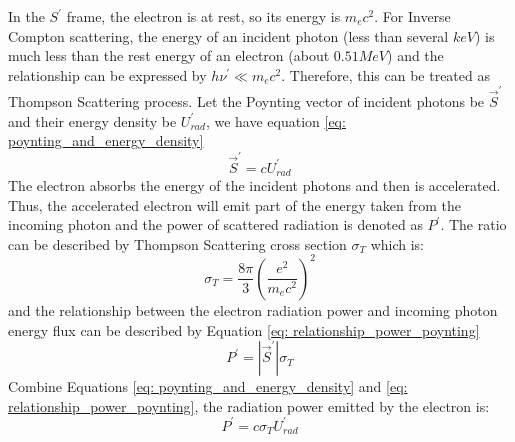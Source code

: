 \documentclass[12pt]{report}
\begin{document}
      In the $S^{\prime}$ frame, the electron is at rest, so its energy is $m_e c^2$. 
      For Inverse Compton scattering, the energy of an incident photon 
      (less than several $keV$) is much less than the rest energy of an electron 
      (about $0.51MeV$) and the relationship can be expressed by 
      $h\nu^{\prime} \ll m_e c^2$. Therefore, this can be treated as Thompson 
      Scattering process. Let the Poynting vector of incident photons be 
      $\vec{S}^{\prime}$ and their energy density be $U_{rad}^{\prime}$, we have 
      equation \ref{eq: poynting_and_energy_density}
      \begin{equation}
        \label{eq: poynting_and_energy_density}
        \vec{S}^{\prime} = c U_{rad}^{\prime}
      \end{equation}
      The electron absorbs the energy of the incident photons and then is accelerated. 
      Thus, the accelerated electron will emit part of the energy taken from the incoming 
      photon and the power of scattered radiation is denoted as $P^{\prime}$.
      The ratio can be described by Thompson Scattering cross section $\sigma_{T}$ 
      which is:
      \begin{equation}
        \label{eq: thompson_cross_section}
        \sigma_{T} = \frac{8\pi}{3} \left(\frac{e^2}{m_e c^2}\right)^2
      \end{equation}
      and the relationship between the electron radiation power and incoming photon 
      energy flux can be described by Equation \ref{eq: relationship_power_poynting}
      \begin{equation}
        \label{eq: relationship_power_poynting}
        P^{\prime} = \left| \vec{S}^{\prime} \right| \sigma_{T}
      \end{equation}
      Combine Equations \ref{eq: poynting_and_energy_density} and 
      \ref{eq: relationship_power_poynting}, the radiation power emitted by the 
      electron is: 
      \begin{equation}
        \label{eq: final_relationship}
        P^{\prime} = c \sigma_{T} U^{\prime}_{rad}
      \end{equation}
\end{document}
